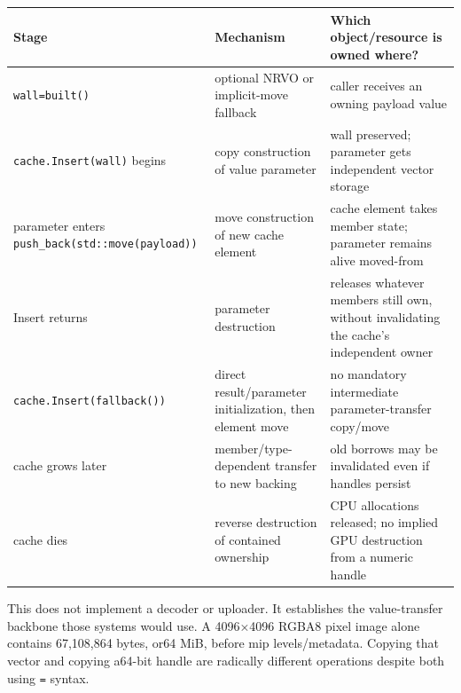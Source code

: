 {\def\LTcaptype{none} %
\begin{longtable}[]{@{}
  >{\raggedright\arraybackslash}p{}
  >{\raggedright\arraybackslash}p{}
  >{\raggedright\arraybackslash}p{}@{}}
\toprule\noalign{}
\begin{minipage}[b]{\linewidth}\raggedright
Stage
\end{minipage} & \begin{minipage}[b]{\linewidth}\raggedright
Mechanism
\end{minipage} & \begin{minipage}[b]{\linewidth}\raggedright
Which object/resource is owned where?
\end{minipage} \\
\midrule\noalign{}
\endhead
\bottomrule\noalign{}
\endlastfoot
\texttt{wall=built()} & optional NRVO or implicit-move fallback & caller receives an owning payload value \\
\texttt{cache.Insert(wall)} begins & copy construction of value parameter & wall preserved; parameter gets independent vector storage \\
parameter enters \texttt{push\_back(std::move(payload))} & move construction of new cache element & cache element takes member state; parameter remains alive moved-from \\
Insert returns & parameter destruction & releases whatever members still own, without invalidating the cache's independent owner \\
\texttt{cache.Insert(fallback())} & direct result/parameter initialization, then element move & no mandatory intermediate parameter-transfer copy/move \\
cache grows later & member/type-dependent transfer to new backing & old borrows may be invalidated even if handles persist \\
cache dies & reverse destruction of contained ownership & CPU allocations released; no implied GPU destruction from a numeric handle \\
\end{longtable}
}

This does not implement a decoder or uploader. It establishes the value-transfer backbone those systems would use. A 4096×4096 RGBA8 pixel image alone contains 67,108,864 bytes, or64 MiB, before mip levels/metadata. Copying that vector and copying a64-bit handle are radically different operations despite both using \texttt{=} syntax.


